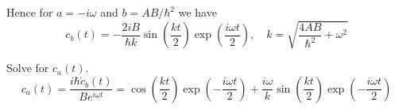 Hence for $a=-i\omega$ and $b=AB/\hbar^2$ we have
\begin{equation*}
c_b(t)=-\frac{2iB}{\hbar k}
\sin\left(\frac{kt}{2}\right)
\exp\left(\frac{i\omega t}{2}\right),\quad
k=\sqrt{\frac{4AB}{\hbar^2}+\omega^2}
\end{equation*}

Solve for $c_a(t)$.
\begin{equation*}
c_a(t)=\frac{i\hbar\dot c_b(t)}{Be^{i\omega t}}
=\cos\left(\frac{kt}{2}\right)\exp\left(-\frac{i\omega t}{2}\right)
+\frac{i\omega}{k}\sin\left(\frac{kt}{2}\right)\exp\left(-\frac{i\omega t}{2}\right)
\end{equation*}


